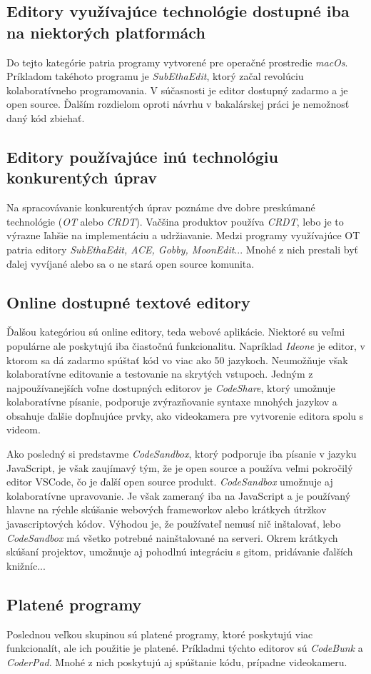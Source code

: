 \subsection{Editory využívajúce technológie dostupné iba na niektorých platformách}
Do tejto kategórie patria programy vytvorené pre operačné prostredie \textit{macOs}.
Príkladom takéhoto programu je \textit{SubEthaEdit}, ktorý začal revolúciu kolaboratívneho 
programovania. V súčasnosti je editor dostupný zadarmo a je open source. Ďalším rozdielom oproti
návrhu v bakalárskej práci je nemožnosť daný kód zbiehať.

\subsection{Editory používajúce inú technológiu konkurentých úprav}
Na spracovávanie konkurentých úprav poznáme dve dobre preskúmané technológie (\textit{OT} alebo
\textit{CRDT}). Vačšina produktov používa \textit{CRDT}, lebo je to výrazne ľahšie na implementáciu
a udržiavanie. Medzi programy využívajúce OT patria editory \textit{SubEthaEdit, ACE, Gobby,
MoonEdit}... Mnohé z nich prestali byť ďalej vyvíjané alebo sa o ne stará open source komunita.

\subsection{Online dostupné textové editory}
Ďalšou kategóriou sú online editory, teda webové aplikácie. Niektoré su veľmi populárne
ale poskytujú iba čiastočnú funkcionalitu. Napríklad \textit{Ideone} je editor, v ktorom
sa dá zadarmo spúštať kód vo viac ako 50 jazykoch. Neumožňuje však kolaboratívne editovanie
a testovanie na skrytých vstupoch.
Jedným z najpoužívanejších voľne dostupných editorov je \textit{CodeShare}, ktorý umožnuje
kolaboratívne písanie, podporuje zvýrazňovanie syntaxe mnohých jazykov a obsahuje ďalšie 
dopľnujúce prvky, ako videokamera pre vytvorenie editora spolu s videom.

Ako posledný si predstavme \textit{CodeSandbox}, ktorý podporuje iba písanie v jazyku JavaScript, je 
však zaujímavý tým, že je open source a používa veľmi pokročilý editor VSCode, čo je ďalší open
source produkt. \textit{CodeSandbox} umožnuje aj kolaboratívne upravovanie. Je však zameraný iba
na JavaScript a je používaný hlavne na rýchle skúšanie webových frameworkov alebo krátkych
útržkov javascriptových kódov. Výhodou je, že používateľ nemusí nič inštalovať, lebo 
\textit{CodeSandbox} má všetko potrebné nainštalované na serveri. Okrem krátkych skúšaní projektov,
umožnuje aj pohodlnú integráciu s gitom, pridávanie ďalších knižníc...

\subsection{Platené programy}
Poslednou veľkou skupinou sú platené programy, ktoré poskytujú viac funkcionalít, ale ich použitie
je platené. Príkladmi týchto editorov sú \textit{CodeBunk} a \textit{CoderPad}. Mnohé z nich
poskytujú aj spúštanie kódu, prípadne videokameru.
